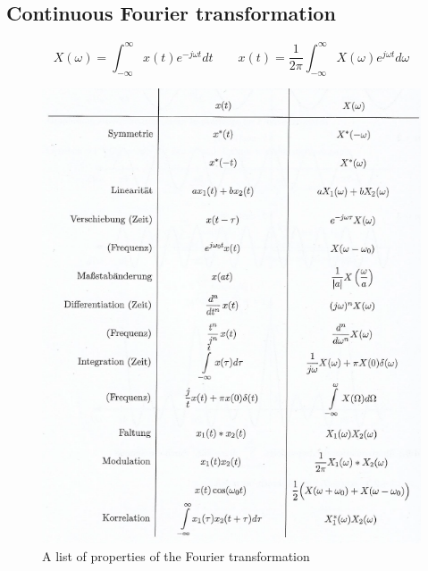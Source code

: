 \documentclass[10pt,a4paper]{article}
\begin{document}
\subsection{Continuous Fourier transformation}
$$
X(\omega) = \int_{-\infty}^{\infty} x(t) e^{-j \omega t} dt \qquad
x(t) = \frac{1}{2\pi} \int_{-\infty}^{\infty} X(\omega) e^{j \omega t} d\omega
$$
\begin{figure}[H]
\centering
\includegraphics[scale=1]{1FourierContProperties.PNG}
\caption{A list of properties of the Fourier transformation}
\label{FourierContProperties}
\end{figure}
\end{document}
